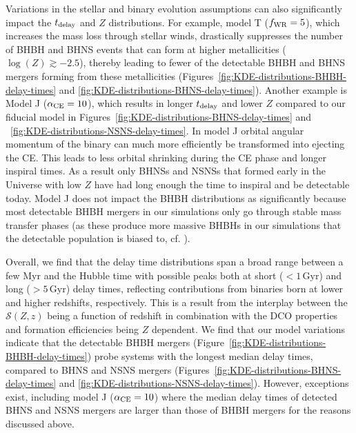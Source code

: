 \documentclass[fleqn,usenatbib]{mnras}
\newcommand{\Zi}{\ensuremath{Z}\xspace}
\newcommand{\Gyr}{\ensuremath{\,\mathrm{Gyr}}\xspace}
\newcommand{\SFRD}{\ensuremath{\mathcal{S}(Z,z)}\xspace}
\newcommand{\tdelay}{\ensuremath{{t}_{\rm{delay}}}\xspace}
\begin{document}
Variations in the stellar and binary evolution assumptions can also significantly impact the \tdelay and \Zi distributions. For example, model T ($f_{\rm{WR}}=5$), which increases the mass loss through stellar winds, drastically suppresses the number of \ac{BHBH} and \ac{BHNS} events that can form at higher metallicities ($\log(\Zi)\gtrsim -2.5$), thereby leading to fewer of the detectable \ac{BHBH} and \ac{BHNS} mergers forming from these metallicities (Figures~\ref{fig:KDE-distributions-BHBH-delay-times} and \ref{fig:KDE-distributions-BHNS-delay-times}). 
Another example is Model J ($\alpha_{\rm{CE}}=10$), which results in longer \tdelay and lower \Zi compared to our fiducial model in Figures~\ref{fig:KDE-distributions-BHNS-delay-times} and ~\ref{fig:KDE-distributions-NSNS-delay-times}. 
In model J orbital angular momentum of the binary can much more efficiently be transformed into ejecting the \ac{CE}. 
This leads to less orbital shrinking during the \ac{CE} phase and longer inspiral times. 
As a result only \acp{BHNS} and \acp{NSNS} that formed early in the Universe with low \Zi have had long enough the time to inspiral and be detectable today. 
Model J does not impact the \ac{BHBH} distributions as significantly because most detectable \ac{BHBH} mergers in our simulations only go through stable mass transfer phases (as these produce more massive \acp{BHBH} in our simulations that the detectable population is biased to, cf. \citealt[][]{vanSon:2021}). 


Overall, we find that the delay time distributions span a broad range between a few Myr and the Hubble time with possible peaks both at short ($ < 1 \Gyr$) and long ($> 5 \Gyr$) delay times, reflecting contributions from binaries born at lower and higher redshifts, respectively. This is a result from the interplay between the \SFRD being a function of redshift in combination with the \ac{DCO} properties and formation efficiencies being \Zi dependent.   We find that our model variations indicate that the detectable \ac{BHBH} mergers (Figure~\ref{fig:KDE-distributions-BHBH-delay-times}) probe systems with the longest median delay times, compared to \ac{BHNS} and \ac{NSNS} mergers (Figures~\ref{fig:KDE-distributions-BHNS-delay-times} and \ref{fig:KDE-distributions-NSNS-delay-times}). However, exceptions exist, including model J ($\alpha_{\rm{CE}}=10$) where the median delay times of detected \ac{BHNS} and \ac{NSNS} mergers are larger than those of \ac{BHBH} mergers for the reasons discussed above. 
\end{document}
